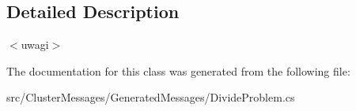 \subsection{Detailed Description}
$<$uwagi$>$ 

The documentation for this class was generated from the following file\+:\begin{DoxyCompactItemize}
\item 
src/\+Cluster\+Messages/\+Generated\+Messages/Divide\+Problem.\+cs\end{DoxyCompactItemize}
